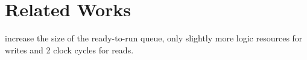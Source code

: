 \chapter{Related Works}
\label{sec:related}

increase the size of the ready-to-run queue, only slightly more logic resources
for writes and 2 clock cycles for reads.

